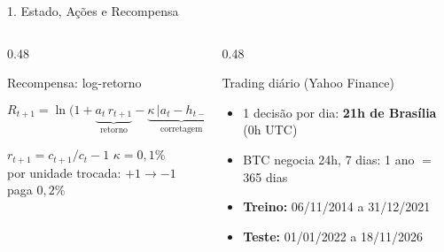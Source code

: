 \documentclass[aspectratio=169,10pt,t]{beamer}
\newenvironment{altura}[2][c]{\begin{minipage}[t][#2][#1]{\linewidth}}{\end{minipage}}
\begin{document}
\begin{frame}{1. Estado, Ações e Recompensa}
  \vskip 0.2cm

  \begin{columns}[T,onlytextwidth]
    \begin{column}{0.48\textwidth}
      \begin{block}{Recompensa: log-retorno}
        \begin{altura}{2.4cm}
        \[
          R_{t+1} = \ln\Big(1 + \underbrace{a_t \, r_{t+1}}_{\text{retorno}} - \underbrace{\kappa\, |a_t - h_{t-1}|}_{\text{corretagem}}\Big)
        \]
        {\centering\footnotesize $r_{t+1} = c_{t+1}/c_t - 1$ \qquad $\kappa = 0{,}1\%$\\
        por unidade trocada: $+1 \to -1$ paga $0{,}2\%$\par}
        \end{altura}
      \end{block}
    \end{column}

    \begin{column}{0.48\textwidth}
      \begin{block}{Trading diário (Yahoo Finance)}
        \begin{altura}{2.4cm}
        \footnotesize
        \begin{itemize}\setlength{\itemsep}{3pt}
          \item 1 decisão por dia: \textbf{21h de Brasília} (0h UTC)
          \item BTC negocia 24h, 7 dias: 1 ano $=$ 365 dias
          \item \textbf{Treino:} 06/11/2014 a 31/12/2021
          \item \textbf{Teste:} 01/01/2022 a 18/11/2026
        \end{itemize}
        \end{altura}
      \end{block}
    \end{column}
  \end{columns}

\end{frame}
\end{document}
